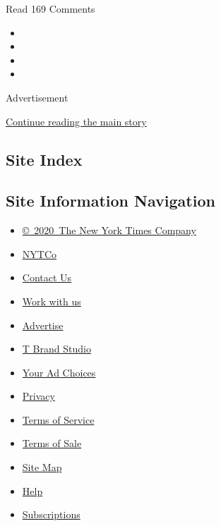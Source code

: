 Read 169 Comments

\begin{itemize}
\item
\item
\item
\item
\end{itemize}

Advertisement

\protect\hyperlink{after-bottom}{Continue reading the main story}

\hypertarget{site-index}{%
\subsection{Site Index}\label{site-index}}

\hypertarget{site-information-navigation}{%
\subsection{Site Information
Navigation}\label{site-information-navigation}}

\begin{itemize}
\tightlist
\item
  \href{https://help.nytimes3xbfgragh.onion/hc/en-us/articles/115014792127-Copyright-notice}{©~2020~The
  New York Times Company}
\end{itemize}

\begin{itemize}
\tightlist
\item
  \href{https://www.nytco.com/}{NYTCo}
\item
  \href{https://help.nytimes3xbfgragh.onion/hc/en-us/articles/115015385887-Contact-Us}{Contact
  Us}
\item
  \href{https://www.nytco.com/careers/}{Work with us}
\item
  \href{https://nytmediakit.com/}{Advertise}
\item
  \href{http://www.tbrandstudio.com/}{T Brand Studio}
\item
  \href{https://www.nytimes3xbfgragh.onion/privacy/cookie-policy\#how-do-i-manage-trackers}{Your
  Ad Choices}
\item
  \href{https://www.nytimes3xbfgragh.onion/privacy}{Privacy}
\item
  \href{https://help.nytimes3xbfgragh.onion/hc/en-us/articles/115014893428-Terms-of-service}{Terms
  of Service}
\item
  \href{https://help.nytimes3xbfgragh.onion/hc/en-us/articles/115014893968-Terms-of-sale}{Terms
  of Sale}
\item
  \href{https://spiderbites.nytimes3xbfgragh.onion}{Site Map}
\item
  \href{https://help.nytimes3xbfgragh.onion/hc/en-us}{Help}
\item
  \href{https://www.nytimes3xbfgragh.onion/subscription?campaignId=37WXW}{Subscriptions}
\end{itemize}
